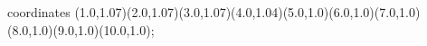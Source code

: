 					coordinates { (1.0,1.07)(2.0,1.07)(3.0,1.07)(4.0,1.04)(5.0,1.0)(6.0,1.0)(7.0,1.0)(8.0,1.0)(9.0,1.0)(10.0,1.0)};